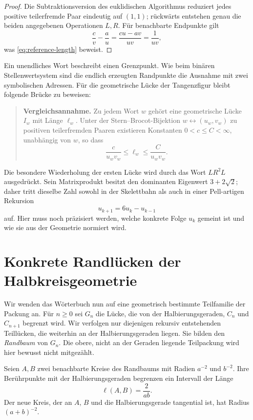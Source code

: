 \documentclass[11pt,a4paper]{article}
\begin{document}
\begin{proof}
Die Subtraktionsversion des euklidischen Algorithmus reduziert jedes
positive teilerfremde Paar eindeutig auf $(1,1)$; rückwärts entstehen genau
die beiden angegebenen Operationen $L,R$. Für benachbarte Endpunkte gilt
\[
 \frac{c}{v}-\frac{a}{u}=\frac{cu-av}{uv}=\frac1{uv},
\]
was \eqref{eq:reference-length} beweist.
\end{proof}

Ein unendliches Wort beschreibt einen Grenzpunkt. Wie beim binären
Stellenwertsystem sind die endlich erzeugten Randpunkte die Ausnahme mit
zwei symbolischen Adressen. Für die geometrische Lücke der Tangenzfigur
bleibt folgende Brücke zu beweisen:

\begin{quote}
\textbf{Vergleichsannahme.} Zu jedem Wort $w$ gehört eine geometrische
Lücke $I_w$ mit Länge $\ell_w$. Unter der Stern--Brocot-Bijektion
$w\leftrightarrow(u_w,v_w)$ zu positiven teilerfremden Paaren existieren
Konstanten $0<c\le C<\infty$, unabhängig von $w$, so dass
\begin{equation}\label{eq:comparison}
 \frac{c}{u_wv_w}\le \ell_w\le\frac{C}{u_wv_w}.
\end{equation}
\end{quote}

Die besondere Wiederholung der ersten Lücke wird durch das Wort $LR^2L$
ausgedrückt. Sein Matrixprodukt besitzt den dominanten Eigenwert
$3+2\sqrt2$; daher tritt dieselbe Zahl sowohl in der Skelettbahn als auch
in einer Pell-artigen Rekursion
\[
 u_{k+1}=6u_k-u_{k-1}
\]
auf. Hier muss noch präzisiert werden, welche konkrete Folge $u_k$ gemeint
ist und wie sie aus der Geometrie normiert wird.

\section{Konkrete Randlücken der Halbkreisgeometrie}

Wir wenden das Wörterbuch nun auf eine geometrisch bestimmte Teilfamilie der
Packung an. Für $n\ge0$ sei $G_n$ die Lücke, die von der Halbierungsgeraden,
$C_n$ und $C_{n+1}$ begrenzt wird. Wir verfolgen nur diejenigen rekursiv
entstehenden Teillücken, die weiterhin an der Halbierungsgeraden liegen.
Sie bilden den \emph{Randbaum} von $G_n$. Die obere, nicht an der Geraden
liegende Teilpackung wird hier bewusst nicht mitgezählt.

Seien $A,B$ zwei benachbarte Kreise des Randbaums mit Radien $a^{-2}$ und
$b^{-2}$. Ihre Berührpunkte mit der Halbierungsgeraden begrenzen ein Intervall
der Länge
\begin{equation}\label{eq:gap-length-exact}
 \ell(A,B)=\frac{2}{ab}.
\end{equation}
Der neue Kreis, der an $A$, $B$ und die Halbierungsgerade tangential ist,
hat Radius $(a+b)^{-2}$.
\end{document}
